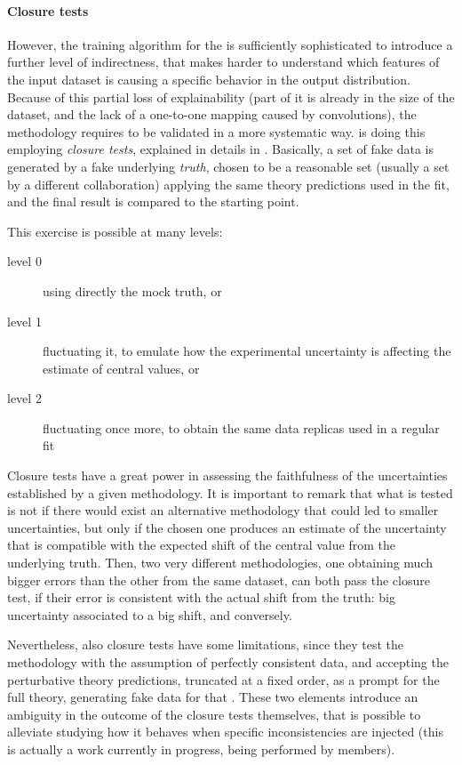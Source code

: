\paragraph{Closure tests} However, the training algorithm for the \nn is
sufficiently sophisticated to introduce a further level of indirectness, that
makes harder to understand which features of the input dataset is causing a
specific behavior in the output distribution.
%
Because of this partial loss of explainability (part of it is already in the
size of the dataset, and the lack of a one-to-one mapping caused by
convolutions), the methodology requires to be validated in a more systematic
way.
%
\nnpdf is doing this employing \textit{closure tests}, explained in details in
\cite{DelDebbio:2021whr}.
%
Basically, a set of fake data is generated by a fake underlying \textit{truth},
chosen to be a reasonable \pdf set (usually a set by a different collaboration)
applying the same theory predictions used in the fit, and the final result is
compared to the starting point.

This exercise is possible at many levels: 
\begin{description}
  \item[level 0] using directly the mock truth, or
  \item[level 1] fluctuating it, to emulate how the experimental uncertainty is
    affecting the estimate of central values, or
  \item[level 2] fluctuating once more, to obtain the same data replicas used
    in a regular fit
\end{description}

Closure tests have a great power in assessing the faithfulness of the
uncertainties established by a given methodology.
%
It is important to remark that what is tested is not if there would exist an
alternative methodology that could led to smaller uncertainties, but only if
the chosen one produces an estimate of the uncertainty that is compatible with
the expected shift of the central value from the underlying truth.
%
Then, two very different methodologies, one obtaining much bigger errors than
the other from the same dataset, can both pass the closure test, if their error
is consistent with the actual shift from the truth: big uncertainty associated
to a big shift, and conversely.

Nevertheless, also closure tests have some limitations, since they test the
methodology with the assumption of perfectly consistent data, and accepting
the perturbative theory predictions, truncated at a fixed order, as a prompt
for the full theory, generating fake data for that \pdf.
%
These two elements introduce an ambiguity in the outcome of the closure tests
themselves, that is possible to alleviate studying how it behaves when specific
inconsistencies are injected (this is actually a work currently in progress,
being performed by \nnpdf members).

